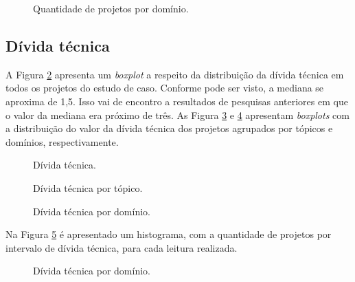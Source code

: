  \begin{figure}[H]
  \centering
  \caption{Quantidade de projetos por domínio.}
  \label{fig:projetos_por_dominio} 
\end{figure}


\subsection{Dívida técnica}

A Figura \ref{fig:boxplot_divida_tecnica} apresenta um \textit{boxplot} a respeito da distribuição da dívida técnica em todos os projetos do estudo de caso. Conforme pode ser visto, a mediana se aproxima de 1,5. Isso vai de encontro a resultados de pesquisas anteriores em que o valor da mediana era próximo de três\cite{de2017technical}. As Figura \ref{fig:divida_por_topico} e \ref{fig:divida_por_dominio} apresentam \textit{boxplots} com a distribuição do valor da dívida técnica dos projetos agrupados por tópicos e domínios, respectivamente. 


 \begin{figure}[H]
  \centering
  \caption{Dívida técnica.}
  \label{fig:boxplot_divida_tecnica} 
\end{figure}

 \begin{figure}[H]
  \centering
  \caption{Dívida técnica por tópico.}
  \label{fig:divida_por_topico} 
\end{figure}

 \begin{figure}[H]
  \centering
  \caption{Dívida técnica por domínio.}
  \label{fig:divida_por_dominio} 
\end{figure}


Na Figura \ref{fig:histograma_leitura_divida} é apresentado um histograma, com a quantidade de projetos por intervalo de dívida técnica, para cada leitura realizada. 

 \begin{figure}[H]
  \centering
  \caption{Dívida técnica por domínio.}
  \label{fig:histograma_leitura_divida} 
\end{figure}


